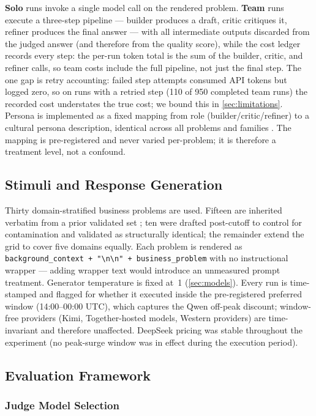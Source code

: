 \documentclass[12pt,a4paper]{article}
\begin{document}
\textbf{Solo} runs invoke a single model call on the rendered problem.
\textbf{Team} runs execute a three-step pipeline --- builder produces a draft,
critic critiques it, refiner produces the final answer --- with all intermediate
outputs discarded from the judged answer (and therefore from the quality score),
while the cost ledger records every step: the per-run token total is the sum of
the builder, critic, and refiner calls, so team costs include the full pipeline,
not just the final step. The one gap is retry accounting: failed step attempts
consumed API tokens but logged zero, so on runs with a retried step (110 of 950
completed team runs) the recorded cost understates the true cost; we bound this
in \cref{sec:limitations}. Persona is implemented as a fixed mapping from role
(builder/critic/refiner) to a cultural persona description, identical across all
problems and families \citep{Hariri2026b}. The mapping is pre-registered and
never varied per-problem; it is therefore a treatment level, not a confound.

\subsection{Stimuli and Response Generation}

Thirty domain-stratified business problems are used. Fifteen are inherited
verbatim from a prior validated set \citep{Hariri2025a}; ten were drafted
post-cutoff to control for contamination and validated as structurally identical;
the remainder extend the grid to cover five domains equally. Each problem is
rendered as \texttt{background\_context + "\textbackslash n\textbackslash n" +
business\_problem} with no instructional wrapper --- adding wrapper text would
introduce an unmeasured prompt treatment. Generator temperature is fixed at~1
(\cref{sec:models}). Every run is time-stamped and flagged for whether it
executed inside the pre-registered preferred window (14:00--00:00 UTC), which
captures the Qwen off-peak discount; window-free providers (Kimi, Together-hosted
models, Western providers) are time-invariant and therefore unaffected.
DeepSeek pricing was stable throughout the experiment (no peak-surge window was
in effect during the execution period).

\subsection{Evaluation Framework}\label{sec:eval}

\subsubsection{Judge Model Selection}
\end{document}
